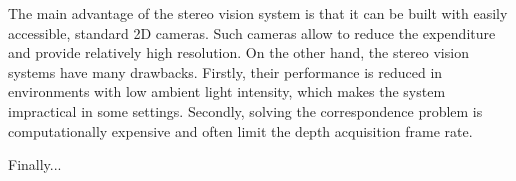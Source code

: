 The main advantage of the stereo vision system is that it can be built with easily accessible, standard 2D cameras. Such cameras allow to reduce the expenditure and provide relatively high resolution. On the other hand, the stereo vision systems have many drawbacks. Firstly, their performance is reduced in environments with low ambient light intensity, which makes the system impractical in some settings. Secondly, solving the correspondence problem is computationally expensive and often limit the depth acquisition frame rate. \begin{Huge} Finally...
\end{Huge} 

